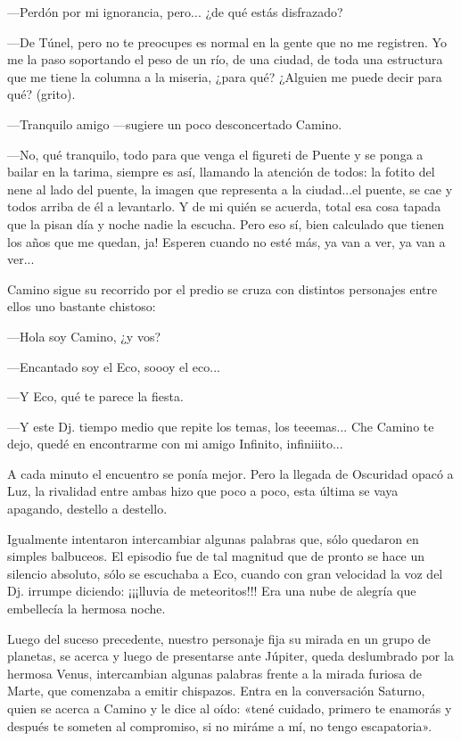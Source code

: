\documentclass[11pt,twoside,openright,a5paper]{book}
\begin{document}
---Perdón por mi ignorancia, pero... ¿de qué estás disfrazado?

---De Túnel, pero no te preocupes es normal en la gente que no me registren. Yo me la paso soportando el peso de un río, de una ciudad, de toda una estructura que me tiene la columna a la miseria, ¿para qué? ¿Alguien me puede decir para qué? (grito).

---Tranquilo amigo ---sugiere un poco desconcertado Camino.

---No, qué tranquilo, todo para que venga el figureti de Puente y se ponga a bailar en la tarima, siempre es así, llamando la atención de todos: la fotito del nene al lado del puente, la imagen que representa a la ciudad...el puente, se cae y todos arriba de él a levantarlo. Y de mi quién se acuerda, total esa cosa tapada que la pisan día y noche nadie la escucha. Pero eso sí, bien calculado que tienen los años que me quedan, ja! Esperen cuando no esté más, ya van a ver, ya van a ver...

Camino sigue su recorrido por el predio se cruza con distintos personajes entre ellos uno bastante chistoso:

---Hola soy Camino, ¿y vos?

---Encantado soy el Eco, soooy el eco...

---Y Eco, qué te parece la fiesta.

---Y este Dj. tiempo medio que repite los temas, los teeemas... Che Camino te dejo, quedé en encontrarme con mi amigo Infinito, infiniiito...

A cada minuto el encuentro se ponía mejor. Pero la llegada de Oscuridad opacó a Luz, la rivalidad entre ambas hizo que poco a poco, esta última se vaya apagando, destello a destello. 

Igualmente intentaron intercambiar algunas palabras que, sólo quedaron en simples balbuceos. El episodio fue de tal magnitud que de pronto se hace un silencio absoluto, sólo se escuchaba a Eco, cuando con gran velocidad la voz del Dj. irrumpe diciendo: ¡¡¡lluvia de meteoritos!!! Era una nube de alegría que embellecía la hermosa noche.

Luego del suceso precedente, nuestro personaje fija su mirada en un grupo de planetas, se acerca y luego de presentarse ante Júpiter, queda deslumbrado por la hermosa Venus, intercambian algunas palabras frente a la mirada furiosa de Marte, que comenzaba a emitir chispazos. Entra en la conversación Saturno, quien se acerca a Camino y le dice al oído: «tené cuidado, primero te enamorás y después te someten al compromiso, si no miráme a mí, no tengo escapatoria».
\end{document}
